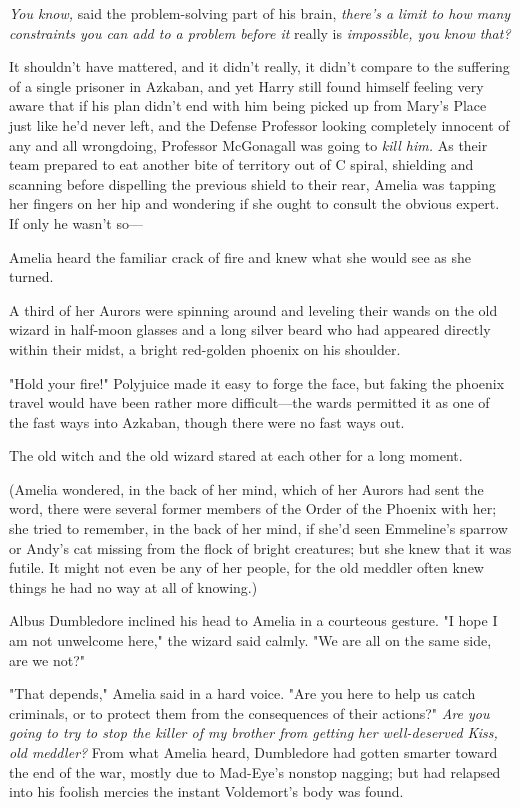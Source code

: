 \emph{You know,} said the problem-solving part of his brain, \emph{there's a
limit to how many constraints you can add to a problem before it} really is
\emph{impossible, you know that?}

It shouldn't have mattered, and it didn't really, it didn't compare to the
suffering of a single prisoner in Azkaban, and yet Harry still found himself
feeling very aware that if his plan didn't end with him being picked up from
Mary's Place just like he'd never left, and the Defense Professor looking
completely innocent of any and all wrongdoing, Professor McGonagall was going
to \emph{kill him.}
\sbreak
As their team prepared to eat another bite of territory out of C spiral,
shielding and scanning before dispelling the previous shield to their rear,
Amelia was tapping her fingers on her hip and wondering if she ought to consult
the obvious expert. If only he wasn't so—

Amelia heard the familiar crack of fire and knew what she would see as she
turned.

A third of her Aurors were spinning around and leveling their wands on the old
wizard in half-moon glasses and a long silver beard who had appeared directly
within their midst, a bright red-golden phoenix on his shoulder.

"Hold your fire!" Polyjuice made it easy to forge the face, but faking the
phoenix travel would have been rather more difficult—the wards permitted it
as one of the fast ways into Azkaban, though there were no fast ways out.

The old witch and the old wizard stared at each other for a long moment.

(Amelia wondered, in the back of her mind, which of her Aurors had sent the
word, there were several former members of the Order of the Phoenix with her;
she tried to remember, in the back of her mind, if she'd seen Emmeline's
sparrow or Andy's cat missing from the flock of bright creatures; but she knew
that it was futile. It might not even be any of her people, for the old meddler
often knew things he had no way at all of knowing.)

Albus Dumbledore inclined his head to Amelia in a courteous gesture. "I hope I
am not unwelcome here," the wizard said calmly. "We are all on the same side,
are we not?"

"That depends," Amelia said in a hard voice. "Are you here to help us catch
criminals, or to protect them from the consequences of their actions?"
\emph{Are you going to try to stop the killer of my brother from getting her
well-deserved Kiss, old meddler?} From what Amelia heard, Dumbledore had gotten
smarter toward the end of the war, mostly due to Mad-Eye's nonstop nagging; but
had relapsed into his foolish mercies the instant Voldemort's body was found.

